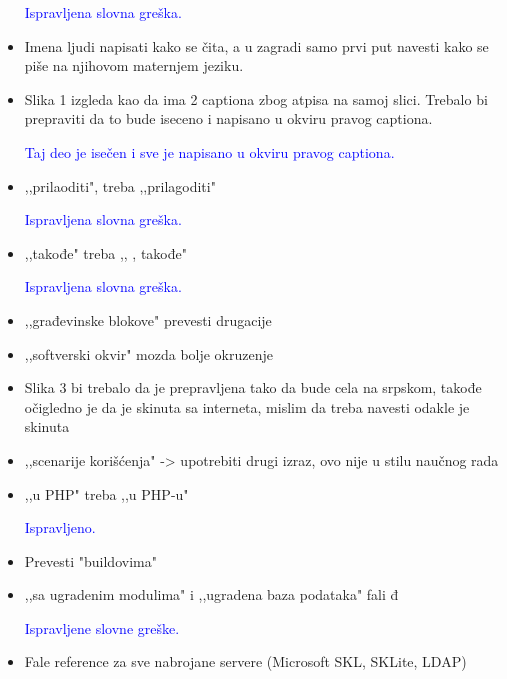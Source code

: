 \documentclass[a4paper]{report}
\newcommand{\odgovor}[1]{\textcolor{blue}{#1}}
\begin{document}
\begin{itemize}
\odgovor{Ispravljena slovna greška.}

\item Imena ljudi napisati kako se čita, a u zagradi samo prvi put navesti kako se piše na njihovom maternjem jeziku.

\odgovor{}

\item Slika 1 izgleda kao da ima 2 captiona zbog atpisa na samoj slici. Trebalo bi prepraviti da to bude iseceno i napisano u okviru pravog captiona.

\odgovor{Taj deo je isečen i sve je napisano u okviru pravog captiona.}

\item ,,prilaoditi", treba ,,prilagoditi" 

\odgovor{Ispravljena slovna greška.}

\item ,,takođe" treba ,, , takođe"

\odgovor{Ispravljena slovna greška.}

\item ,,građevinske blokove" prevesti drugacije

\odgovor{}

\item ,,softverski okvir"  mozda bolje okruzenje

\odgovor{}

\item Slika 3 bi trebalo da je prepravljena tako da bude cela na srpskom, takođe očigledno je da je skinuta sa interneta, mislim da treba navesti odakle je skinuta

\odgovor{}

\item ,,scenarije korišćenja" -> upotrebiti drugi izraz, ovo nije u stilu naučnog rada

\odgovor{}

\item ,,u PHP" treba ,,u PHP-u"

\odgovor{Ispravljeno.}

\item Prevesti "buildovima"

\odgovor{}

\item ,,sa ugradenim modulima" i ,,ugradena baza podataka" fali đ

\odgovor{Ispravljene slovne greške.}

\item Fale reference za sve nabrojane servere (Microsoft SKL, SKLite, LDAP)


\end{itemize}
\end{document}
